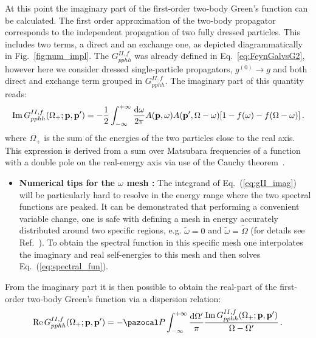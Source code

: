  At this point the imaginary part of the first-order two-body Green's function can be calculated. The first order approximation of the two-body propagator corresponds to the independent propagation of two fully dressed particles. This includes two terms, a direct and an exchange one, as depicted diagrammatically in Fig.~\ref{fig:num_impl}. The $G^{II,f}_{pphh}$ was already defined in Eq.~\eqref{eq:FeynGalvsG2}, however here we consider dressed single-particle propagators, $g^{(0)}\rightarrow g$ and both direct and exchange term grouped in $G^{II,f}_{pphh}$.
The imaginary part of this quantity reads:
\begin{equation}
\label{eq:gII_imag}
{\rm Im} \, G^{II,f}_{pphh}(\Omega_+;{\bf p},{\bf p'}) = -\frac{1}{2}\int_{-\infty}^{+\infty}\frac{{\rm d}{\omega}}{2\pi}A({\bf p},\omega)A({\bf p'},\Omega-\omega)[1-f(\omega)-f(\Omega-\omega)]\,.
\end{equation}
where $\Omega_+$ is the sum of the energies of the two particles close to the real axis. This expression is derived from a sum over Matsubara frequencies of a function with a double pole on the real-energy axis via use of the Cauchy theorem~\cite{ch11_Rios2007PhD}.
\begin{itemize}
\item {\bf Numerical tips for the $\omega$ mesh :} The integrand of Eq.~(\ref{eq:gII_imag}) will be particularly hard to resolve in the energy range where the two spectral functions are peaked. It can be demonstrated that performing a convenient variable change, one is safe with defining a mesh in energy accurately distributed around two specific regions, e.g. $\tilde\omega=0$ and $\tilde\omega=\tilde\Omega$ (for details see Ref.~\cite{ch11_Rios2007PhD}). To obtain the spectral function in this specific mesh one interpolates the imaginary and real self-energies to this mesh and then solves Eq.~(\ref{eq:spectral_fun}).
\end{itemize}

 From the imaginary part it is then possible to obtain the real-part of the first-order two-body Green's function via a dispersion relation:
\begin{equation}
{\rm Re} \, G^{II,f}_{pphh}(\Omega_+;{\bf p},{\bf p'}) = -{\pazocal P}\int_{-\infty}^{+\infty}\frac{{\rm d}{\Omega'}}{\pi}\frac{{\rm Im} \, G^{II,f}_{pphh}(\Omega_+;{\bf p},{\bf p'})}{\Omega-\Omega'}\,.
\end{equation}

